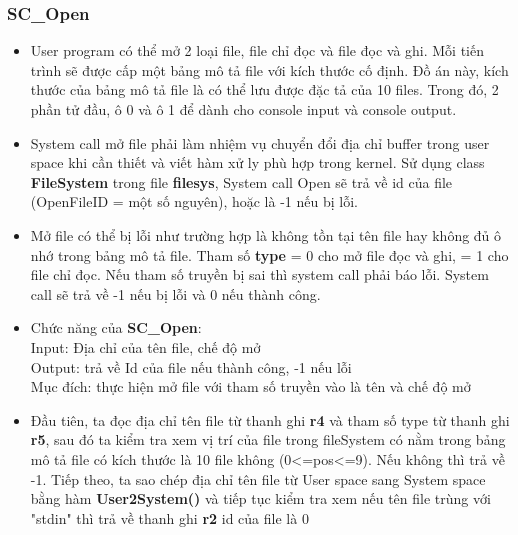 \documentclass[12pt,a4paper]{article}
\begin{document}
\subsubsection{SC\_Open}
\begin{itemize}
    \item \textnormal{User program có thể mở 2 loại file, file chỉ đọc và file đọc và ghi. Mỗi tiến trình sẽ được cấp một bảng mô tả file với kích thước cố định. Đồ án này, kích thước của bảng mô tả file là có thể lưu được đặc tả của 10 files. Trong đó, 2 phần tử đầu, ô 0 và ô 1 để dành cho console input và console output.}
    \item \textnormal{System call mở file phải làm nhiệm vụ chuyển đổi địa chỉ buffer trong user space khi cần thiết và viết hàm xử ly phù hợp trong kernel. Sử dụng class \textbf{FileSystem} trong file \textbf{filesys}, System call Open sẽ trả về id của file (OpenFileID = một số nguyên), hoặc là -1 nếu bị lỗi.} 
    \item \textnormal{Mở file có thể bị lỗi như trường hợp là không tồn tại tên file hay không đủ ô nhớ trong bảng mô tả file. Tham số \textbf{type} = 0 cho mở file đọc và ghi, = 1 cho file chỉ đọc. Nếu tham số truyền bị sai thì system call phải báo lỗi. System call sẽ trả về -1 nếu bị lỗi và 0 nếu thành công. }
    \item \textnormal{Chức năng của \textbf{SC\_Open}:}\\
    \textnormal{Input: Địa chỉ của tên file, chế độ mở}\\
    \textnormal{Output: trả về Id của file nếu thành công, -1 nếu lỗi}\\
    \textnormal{Mục đích: thực hiện mở file với tham số truyền vào là tên và chế độ mở}
    \item \textnormal{Đầu tiên, ta đọc địa chỉ tên file từ thanh ghi \textbf{r4} và tham số type từ thanh ghi \textbf{r5}, sau đó ta kiểm  tra xem vị trí của file trong fileSystem có nằm trong bảng mô tả file có kích thước là 10 file không (0<=pos<=9). Nếu không thì trả về -1. Tiếp theo, ta sao chép địa chỉ tên file từ User space sang System space bằng hàm \textbf{User2System()} và tiếp tục kiểm tra xem nếu tên file trùng với "stdin" thì trả về thanh ghi \textbf{r2} id của file là 0}
\end{itemize}
\end{document}
